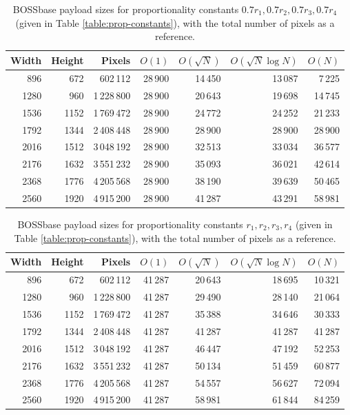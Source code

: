 \documentclass[11pt,a4paper,twoside,openright]{report}
\begin{document}
\begin{appendices}
\begin{table}[htbp]
\begin{center}
\begin{tabular}{ | r r | r | r r r r | }
\hline
Width & Height & Pixels & $O(1)$ & $O(\sqrt{N})$ & $O(\sqrt{N} \log N)$ & $O(N)$ \\ \hline
896 & 672 & 602\,112 & 28\,900 & 14\,450 & 13\,087 & 7\,225 \\
1280 & 960 & 1\,228\,800 & 28\,900 & 20\,643 & 19\,698 & 14\,745 \\
1536 & 1152 & 1\,769\,472 & 28\,900 & 24\,772 & 24\,252 & 21\,233 \\
1792 & 1344 & 2\,408\,448 & 28\,900 & 28\,900 & 28\,900 & 28\,900 \\
2016 & 1512 & 3\,048\,192 & 28\,900 & 32\,513 & 33\,034 & 36\,577 \\
2176 & 1632 & 3\,551\,232 & 28\,900 & 35\,093 & 36\,021 & 42\,614 \\
2368 & 1776 & 4\,205\,568 & 28\,900 & 38\,190 & 39\,639 & 50\,465 \\
2560 & 1920 & 4\,915\,200 & 28\,900 & 41\,287 & 43\,291 & 58\,981 \\ \hline
\end{tabular}
\caption{BOSSbase payload sizes for proportionality constants $0.7 r_1, 0.7 r_2, 0.7 r_3, 0.7 r_4$ (given in Table \ref{table:prop-constants}), with the total number of pixels as a reference.}
\end{center}
\end{table}

\begin{table}[htbp]
\begin{center}
\begin{tabular}{ | r r | r | r r r r | }
\hline
Width & Height & Pixels & $O(1)$ & $O(\sqrt{N})$ & $O(\sqrt{N} \log N)$ & $O(N)$ \\ \hline
896 & 672 & 602\,112 & 41\,287 & 20\,643 & 18\,695 & 10\,321 \\
1280 & 960 & 1\,228\,800 & 41\,287 & 29\,490 & 28\,140 & 21\,064 \\
1536 & 1152 & 1\,769\,472 & 41\,287 & 35\,388 & 34\,646 & 30\,333 \\
1792 & 1344 & 2\,408\,448 & 41\,287 & 41\,287 & 41\,287 & 41\,287 \\
2016 & 1512 & 3\,048\,192 & 41\,287 & 46\,447 & 47\,192 & 52\,253 \\
2176 & 1632 & 3\,551\,232 & 41\,287 & 50\,134 & 51\,459 & 60\,877 \\
2368 & 1776 & 4\,205\,568 & 41\,287 & 54\,557 & 56\,627 & 72\,094 \\
2560 & 1920 & 4\,915\,200 & 41\,287 & 58\,981 & 61\,844 & 84\,259 \\ \hline
\end{tabular}
\caption{BOSSbase payload sizes for proportionality constants $r_1, r_2, r_3, r_4$ (given in Table \ref{table:prop-constants}), with the total number of pixels as a reference.}
\end{center}
\end{table}


\end{appendices}
\end{document}
